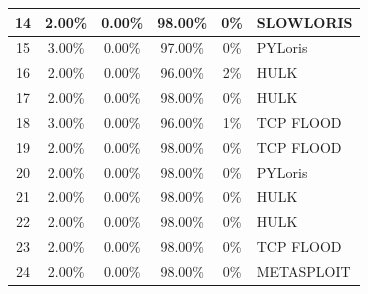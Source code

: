 \begin{table}[H]
\begin{tabular}{|c|c|c|c|c|l|}
		14        & 2.00\%   & 0.00\%                                                 & 98.00\% & 0\%    & SLOWLORIS  \\ \hline
		15        & 3.00\%   & 0.00\%                                                 & 97.00\% & 0\%    & PYLoris    \\ \hline
		16        & 2.00\%   & 0.00\%                                                 & 96.00\% & 2\%    & HULK       \\ \hline
		17        & 2.00\%   & 0.00\%                                                 & 98.00\% & 0\%    & HULK       \\ \hline
		18        & 3.00\%   & 0.00\%                                                 & 96.00\% & 1\%    & TCP FLOOD  \\ \hline
		19        & 2.00\%   & 0.00\%                                                 & 98.00\% & 0\%    & TCP FLOOD  \\ \hline
		20        & 2.00\%   & 0.00\%                                                 & 98.00\% & 0\%    & PYLoris    \\ \hline
		21        & 2.00\%   & 0.00\%                                                 & 98.00\% & 0\%    & HULK       \\ \hline
		22        & 2.00\%   & 0.00\%                                                 & 98.00\% & 0\%    & HULK       \\ \hline
		23        & 2.00\%   & 0.00\%                                                 & 98.00\% & 0\%    & TCP FLOOD  \\ \hline
		24        & 2.00\%   & 0.00\%                                                 & 98.00\% & 0\%    & METASPLOIT \\ \hline
		
	\end{tabular}
\end{table}
		
